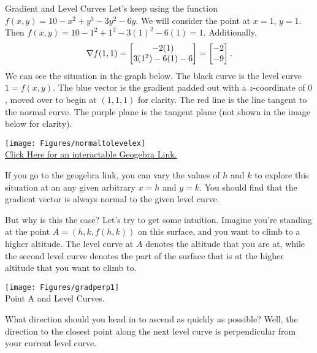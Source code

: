 \begin{example}{Gradient and Level Curves}
Let's keep using the function $f(x,y)=10-x^2+y^3-3y^2-6y$. We will consider the point at $x=1$, $y=1$. Then $f(x,y)=10-1^2+1^3-3(1)^2-6(1)=1$. Additionally, $$\nabla f(1,1)=\begin{bmatrix}-2(1)\\3(1^2)-6(1)-6\end{bmatrix}=\begin{bmatrix}-2\\-9\end{bmatrix}.$$
We can see the situation in the graph below. The black curve is the level curve $1=f(x,y)$. The blue vector is the gradient padded out with a $z$-coordinate of $0$, moved over to begin at $(1,1,1)$ for clarity. The red line is the line tangent to the normal curve. The purple plane is the tangent plane (not shown in the image below for clarity).
\vspace{1em}
\begin{center}
\texttt{[image: Figures/normaltolevelex]}\\
\href{https://www.geogebra.org/3d/w3hdn8w7}{Click Here for an interactable Geogebra Link.}
\end{center}
\vspace{1em}

If you go to the geogebra link, you can vary the values of $h$ and $k$ to explore this situation at an any given arbitrary $x=h$ and $y=k$. You should find that the gradient vector is always normal to the given level curve.

\vspace{1em}

But why is this the case? Let's try to get some intuition. Imagine you're standing at the point $A=(h,k,f(h,k))$ on this surface, and you want to climb to a higher altitude. The level curve at $A$ denotes the altitude that you are at, while the second level curve denotes the part of the surface that is at the higher altitude that you want to climb to.
\vspace{1em}
\begin{center}
\texttt{[image: Figures/gradperp1]}\\
Point A and Level Curves.
\end{center}
\vspace{1em}
What direction should you head in to ascend as quickly as possible? Well, the direction to the closest point along the next level curve is perpendicular from your current level curve. 

\vspace{1em}


\end{example}
